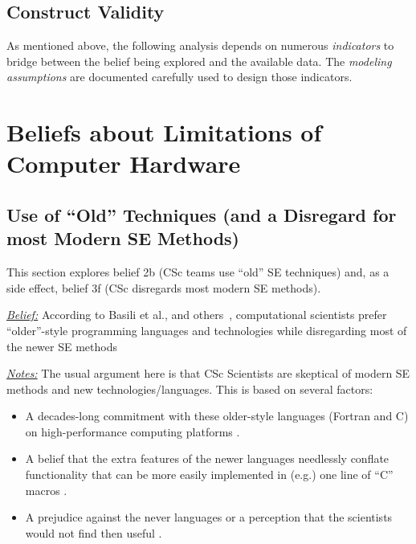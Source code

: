 \documentclass[conference,10pt]{IEEEtran}
\begin{document}
\subsection{Construct Validity}
As mentioned above, the following analysis depends on numerous {\em indicators} to bridge between the belief being explored and the available data. 
The {\em modeling assumptions} are documented carefully  used to design those indicators.

\section{Beliefs about Limitations of Computer Hardware}


\subsection{Use of ``Old'' Techniques (and a Disregard for  most Modern SE Methods)}\label{lang}
This section explores belief 2b (CSc teams use ``old'' SE techniques)
and, as a side effect, belief 3f (CSc disregards most modern SE methods).

\noindent \textit{\underline{Belief:}} According to Basili et al., and others~\cite{basili08_hpc, carver07_environment, Prabhu11_cssurvey, kendall05_C, ragan14_pythoncs},
computational scientists prefer
``older''-style programming languages and technologies while disregarding most of the newer SE methods

\noindent \textit{\underline{Notes:}} The usual argument here is that CSc Scientists are skeptical of modern SE methods and new technologies/languages.
This is based on several factors: 
\begin{itemize}
  \item A decades-long commitment with these older-style languages (Fortran and C) on high-performance computing platforms \cite{faulk09_secs}.
  \item A belief that the extra features of the newer languages needlessly conflate functionality that can be more easily implemented in (e.g.) one line of ``C'' macros \cite{sanders08_risk}. 
  \item A prejudice against the never languages or a perception that the scientists would not find then useful \cite{Prabhu11_cssurvey}. 
\end{itemize}
\end{document}
